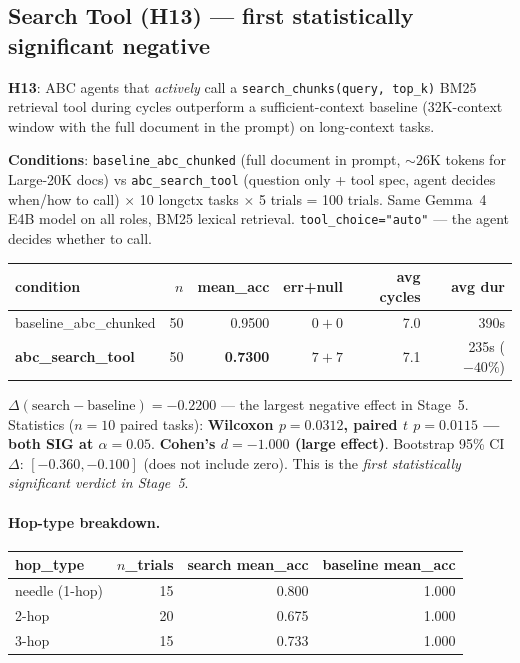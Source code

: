 \documentclass[11pt]{article}
\newcommand{\code}[1]{\texttt{#1}}
\newcommand{\sig}{\textbf{SIG}}
\begin{document}
\subsection{Search Tool (H13) --- first statistically significant negative}\label{sec:h13}

\textbf{H13}: ABC agents that \emph{actively} call a \code{search\_chunks(query, top\_k)} BM25 retrieval tool during cycles outperform a sufficient-context baseline (32K-context window with the full document in the prompt) on long-context tasks.

\textbf{Conditions}: \code{baseline\_abc\_chunked} (full document in prompt, $\sim\!26$K tokens for Large-20K docs) vs \code{abc\_search\_tool} (question only + tool spec, agent decides when/how to call) $\times$ 10 longctx tasks $\times$ 5 trials = 100 trials. Same Gemma~4 E4B model on all roles, BM25 lexical retrieval. \code{tool\_choice="auto"} --- the agent decides whether to call.

\begin{table}[h]
\centering
\small
\begin{tabular}{@{}lrrrrr@{}}
\toprule
condition & $n$ & mean\_acc & err+null & avg cycles & avg dur \\
\midrule
baseline\_abc\_chunked & 50 & 0.9500 & $0+0$ & 7.0 & 390s \\
\textbf{abc\_search\_tool} & 50 & \textbf{0.7300} & $7+7$ & 7.1 & 235s ($-40\%$) \\
\bottomrule
\end{tabular}
\end{table}

$\Delta(\text{search}-\text{baseline}) = \mathbf{-0.2200}$ --- the largest negative effect in Stage~5. Statistics ($n\!=\!10$ paired tasks): \textbf{Wilcoxon $p\!=\!0.0312$, paired $t$ $p\!=\!0.0115$ --- both \sig{} at $\alpha\!=\!0.05$}. \textbf{Cohen's $d = -1.000$ (large effect)}. Bootstrap 95\% CI $\Delta$: $\mathbf{[-0.360, -0.100]}$ (does not include zero). This is the \emph{first statistically significant verdict in Stage~5}.

\paragraph{Hop-type breakdown.}

\begin{table}[h]
\centering
\small
\begin{tabular}{@{}lrrr@{}}
\toprule
hop\_type & $n$\_trials & search mean\_acc & baseline mean\_acc \\
\midrule
needle (1-hop) & 15 & 0.800 & 1.000 \\
2-hop & 20 & 0.675 & 1.000 \\
3-hop & 15 & 0.733 & 1.000 \\
\bottomrule
\end{tabular}
\end{table}
\end{document}
